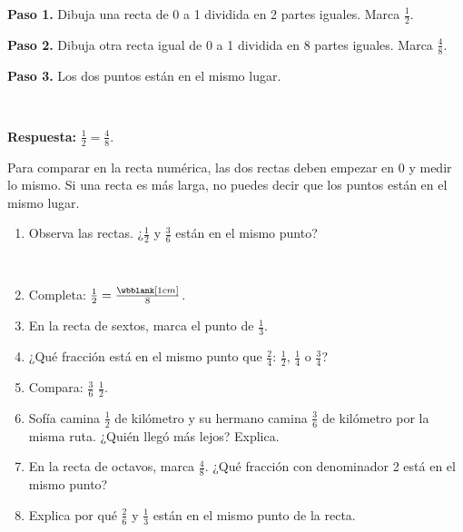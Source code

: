 \begin{wbexample}
\textbf{Paso 1.} Dibuja una recta de 0 a 1 dividida en 2 partes iguales. Marca $\frac{1}{2}$.

\textbf{Paso 2.} Dibuja otra recta igual de 0 a 1 dividida en 8 partes iguales. Marca $\frac{4}{8}$.

\textbf{Paso 3.} Los dos puntos están en el mismo lugar.

\begin{center}
\\[2pt]
\end{center}

\textbf{Respuesta:} $\frac{1}{2}=\frac{4}{8}$.
\end{wbexample}

\begin{wbtip}[Cuidado]
Para comparar en la recta numérica, las dos rectas deben empezar en 0 y medir lo mismo. Si una recta es más larga, no puedes decir que los puntos están en el mismo lugar.
\end{wbtip}

\begin{wbpractice}
\begin{enumerate}
\item Observa las rectas. ¿$\frac{1}{2}$ y $\frac{3}{6}$ están en el mismo punto? 

\begin{center}
\\[2pt]
\end{center}

\item Completa: $\frac{1}{2}=\frac{\wbblank[1cm]}{8}$. 

\item En la recta de sextos, marca el punto de $\frac{1}{3}$. 


\item ¿Qué fracción está en el mismo punto que $\frac{2}{4}$: $\frac{1}{2}$, $\frac{1}{4}$ o $\frac{3}{4}$? 

\item Compara: $\frac{3}{6}$ \wbblank[1.5cm] $\frac{1}{2}$. 

\item Sofía camina $\frac{1}{2}$ de kilómetro y su hermano camina $\frac{3}{6}$ de kilómetro por la misma ruta. ¿Quién llegó más lejos? Explica. 

\item En la recta de octavos, marca $\frac{4}{8}$. ¿Qué fracción con denominador 2 está en el mismo punto? 


\item Explica por qué $\frac{2}{6}$ y $\frac{1}{3}$ están en el mismo punto de la recta. 
\end{enumerate}
\end{wbpractice}

